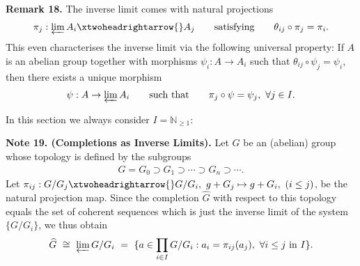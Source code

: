\documentclass[12pt,a4paper,footinclude=true,headinclude=true]{scrbook} %
\newenvironment{remark}[2][Remark]
    { \begin{mdframed}[backgroundcolor=gray!20] \textbf{#1 #2.} }
    {  \end{mdframed}}
\newenvironment{nt}[2][Note]
    { \begin{mdframed}[backgroundcolor=gray!20] \textbf{#1 #2.} }
    {  \end{mdframed}}
\begin{document}
\begin{remark}{18}
    The inverse limit comes with natural projections
    \begin{align*}
        \pi_j:\varprojlim A_i\xtwoheadrightarrow{} A_j \qquad\text{satisfying}\qquad \theta_{ij}\circ\pi_j=\pi_i.
    \end{align*}
    This even characterises the inverse limit via the following universal property: If $A$ is an abelian group together with morphisms $\psi_i:A\to A_i$ such that $\theta_{ij}\circ\psi_j=\psi_i$, then there exists a unique morphism 
    \begin{align*}
        \psi:A\to\varprojlim A_i\qquad\text{such that}\qquad \pi_j\circ\psi=\psi_j,\ \forall j\in I.
    \end{align*}
    \begin{center}
    \end{center}
\end{remark}
\newpage
In this section we always consider $I=\mathbb{N}_{\geq1}$: 
\begin{nt}{19. (Completions as Inverse Limits)}
    \newline Let $G$ be an (abelian) group whose topology is defined by the subgroups
    \begin{align*}
        G=G_0\supset G_1\supset\cdots\supset G_n\supset\cdots.
    \end{align*}
    Let $\pi_{ij}:G/G_j\xtwoheadrightarrow{} G/G_i,\ g+G_j\mapsto g+G_i,\ (i\leq j)$, be the natural projection map. Since the completion $\widehat{G}$ with respect to this topology equals the set of coherent sequences which is just the inverse limit of the system $\{G/G_i\}$, we thus obtain
    \begin{align*}
        \widehat{G}\ \cong\ \varprojlim G/G_i\ =\ \{a\in\prod_{i\in I}G/G_i:a_i=\pi_{ij}(a_j),\ \forall i\leq j\ \text{in}\ I\}.
    \end{align*}
\end{nt}
\end{document}
